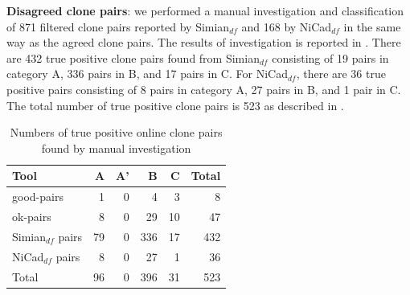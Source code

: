 \documentclass{sig-alternate-05-2015}
\begin{document}
\textbf{Disagreed clone pairs}: we performed a manual investigation and classification of 871 filtered clone pairs reported by Simian$_{df}$ and 168 by NiCad$_{df}$ in the same way as the agreed clone pairs. The results of investigation is reported in . There are 432 true positive clone pairs found from Simian$_{df}$ consisting of 19 pairs in category A, 336 pairs in B, and 17 pairs in C. For NiCad$_{df}$, there are 36 true positive pairs consisting of 8 pairs in category A, 27 pairs in B, and 1 pair in C. The total number of true positive clone pairs is 523 as described in .

\begin{table}[H]
	\centering
	\caption{Numbers of true positive online clone pairs found by manual investigation}
	\label{tab:classification_true_pairs_summary}
	\small
	\begin{tabular}{l|r|r|r|r|r}
		\hline 
		Tool & A & A' & B & C & Total \\
		\hline
		good-pairs & 1 & 0 & 4 & 3 & 8 \\
		ok-pairs & 8 & 0 & 29 & 10 & 47 \\
		Simian$_{df}$ pairs & 79 & 0 & 336 & 17 & 432 \\
		NiCad$_{df}$ pairs & 8 & 0 & 27 & 1 & 36 \\
		\hline 
		Total & 96 & 0 & 396 & 31 & 523 \\
		\hline
	\end{tabular} 
\end{table}
\end{document}
